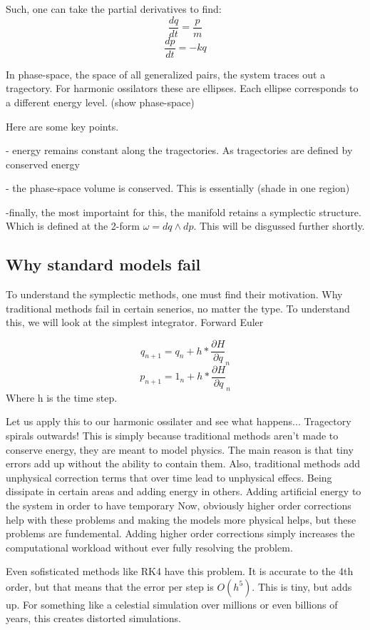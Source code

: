 Such, one can take the partial derivatives to find:
\[
	\frac{dq}{dt} = \frac{p}{m}
\]
\[
	\frac{dp}{dt} = -kq
\]

In phase-space, the space of all generalized pairs, the system traces out a tragectory. For harmonic ossilators these are ellipses. Each ellipse corresponds to a different energy level.
(show phase-space)

Here are some key points.

- energy remains constant along the tragectories. As tragectories are defined by conserved energy

- the phase-space volume is conserved. This is essentially
(shade in one region)

-finally, the most importaint for this, the manifold retains a symplectic structure. Which is defined at the 2-form $ \omega = dq \wedge dp$. This will be disgussed further shortly.

\subsection{Why standard models fail}
To understand the symplectic methods, one must find their motivation. Why traditional methods fail in certain senerios, no matter the type. To understand this, we will look at the simplest integrator. Forward Euler

\[
	q_{n+1} = q_n + h * \frac{\partial H}{\partial q}_n
\]
\[
	p_{n+1}=1_n +h * \frac{\partial H}{\partial q}_n
\]
Where h is the time step.

Let us apply this to our harmonic ossilater and see what happens... Tragectory spirals outwards! This is simply because traditional methods aren't made to conserve energy, they are meant to model physics. The main reason is that tiny errors add up without the ability to contain them. Also, traditional methods add unphysical correction terms that over time lead to unphysical effecs. Being dissipate in certain areas and adding energy in others. Adding artificial energy to the system in order to have temporary  Now, obviously higher order corrections help with these problems and making the models more physical helps, but these problems are fundemental. Adding higher order corrections simply increases the computational workload without ever fully resolving the problem.

Even sofisticated methods like RK4 have this problem. It is accurate to the 4th order, but that means that the error per step is $O(h^5)$. This is tiny, but adds up. For something like a celestial simulation over millions or even billions of years, this creates distorted simulations.

